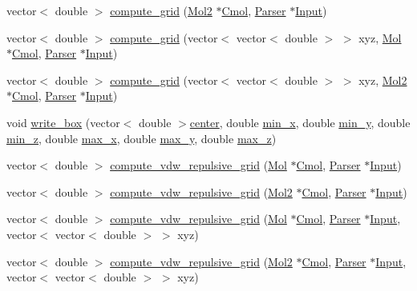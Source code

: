 \begin{DoxyCompactItemize}
\item 
vector$<$ double $>$ \hyperlink{classGrid_a97d1697a546a55da45d7ccca26b097e6}{compute\_\-grid} (\hyperlink{classMol2}{Mol2} $\ast$\hyperlink{classGrid_ab5087e114551f00fbb0d281b801d3dfc}{Cmol}, \hyperlink{classParser}{Parser} $\ast$\hyperlink{classGrid_aa9824cf9539971c3d32e92532c9c37be}{Input})
\item 
vector$<$ double $>$ \hyperlink{classGrid_aa92e40ab2d91491f715dd64ea011d865}{compute\_\-grid} (vector$<$ vector$<$ double $>$ $>$ xyz, \hyperlink{classMol}{Mol} $\ast$\hyperlink{classGrid_ab5087e114551f00fbb0d281b801d3dfc}{Cmol}, \hyperlink{classParser}{Parser} $\ast$\hyperlink{classGrid_aa9824cf9539971c3d32e92532c9c37be}{Input})
\item 
vector$<$ double $>$ \hyperlink{classGrid_a4a11a22c3a40911fd084d26c90d93400}{compute\_\-grid} (vector$<$ vector$<$ double $>$ $>$ xyz, \hyperlink{classMol2}{Mol2} $\ast$\hyperlink{classGrid_ab5087e114551f00fbb0d281b801d3dfc}{Cmol}, \hyperlink{classParser}{Parser} $\ast$\hyperlink{classGrid_aa9824cf9539971c3d32e92532c9c37be}{Input})
\item 
void \hyperlink{classGrid_ac47ec8672fada6fd797e3088d6b97807}{write\_\-box} (vector$<$ double $>$\hyperlink{classGrid_a9a5662b9d7dafec37fe08f5851f7926c}{center}, double \hyperlink{classGrid_a16930d1358fd0b70fc84031dbd1b6149}{min\_\-x}, double \hyperlink{classGrid_ac5c22ae5c418071029cd7b4613704be3}{min\_\-y}, double \hyperlink{classGrid_a492df49b72c09feb4e9c5ab2e28ece24}{min\_\-z}, double \hyperlink{classGrid_a72ca32ea381e695f8705fcd3ff248523}{max\_\-x}, double \hyperlink{classGrid_a8f3f3adf7d9a7bfe12f842603fd78787}{max\_\-y}, double \hyperlink{classGrid_a4c93a619b7ef2501f1eb16cb0efc4a09}{max\_\-z})
\item 
vector$<$ double $>$ \hyperlink{classGrid_ade0b395e445c10e6283278e013df8b6f}{compute\_\-vdw\_\-repulsive\_\-grid} (\hyperlink{classMol}{Mol} $\ast$\hyperlink{classGrid_ab5087e114551f00fbb0d281b801d3dfc}{Cmol}, \hyperlink{classParser}{Parser} $\ast$\hyperlink{classGrid_aa9824cf9539971c3d32e92532c9c37be}{Input})
\item 
vector$<$ double $>$ \hyperlink{classGrid_abf80e1b21d01043995f0b03da28b47a7}{compute\_\-vdw\_\-repulsive\_\-grid} (\hyperlink{classMol2}{Mol2} $\ast$\hyperlink{classGrid_ab5087e114551f00fbb0d281b801d3dfc}{Cmol}, \hyperlink{classParser}{Parser} $\ast$\hyperlink{classGrid_aa9824cf9539971c3d32e92532c9c37be}{Input})
\item 
vector$<$ double $>$ \hyperlink{classGrid_a2593908db0c66fae993f7c382b021c57}{compute\_\-vdw\_\-repulsive\_\-grid} (\hyperlink{classMol}{Mol} $\ast$\hyperlink{classGrid_ab5087e114551f00fbb0d281b801d3dfc}{Cmol}, \hyperlink{classParser}{Parser} $\ast$\hyperlink{classGrid_aa9824cf9539971c3d32e92532c9c37be}{Input}, vector$<$ vector$<$ double $>$ $>$ xyz)
\item 
vector$<$ double $>$ \hyperlink{classGrid_a075128538932e833ffdb57cde197c540}{compute\_\-vdw\_\-repulsive\_\-grid} (\hyperlink{classMol2}{Mol2} $\ast$\hyperlink{classGrid_ab5087e114551f00fbb0d281b801d3dfc}{Cmol}, \hyperlink{classParser}{Parser} $\ast$\hyperlink{classGrid_aa9824cf9539971c3d32e92532c9c37be}{Input}, vector$<$ vector$<$ double $>$ $>$ xyz)
\end{DoxyCompactItemize}
